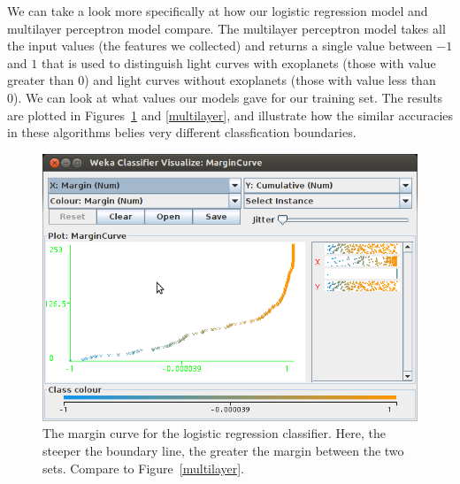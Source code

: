 \documentclass{amsart}
\begin{document}
We can take a look more specifically at how our logistic regression model and multilayer perceptron model compare. The multilayer perceptron model takes all the input values (the features we collected) and returns a single value between $-1$ and $1$ that is used to distinguish light curves with exoplanets (those with value greater than 0) and light curves without exoplanets (those with value less than 0). We can look at what values our models gave for our training set. The results are plotted in Figures~\ref{logistic} and \ref{multilayer}, and illustrate how the similar accuracies in these algorithms belies very different classfication boundaries.
	\begin{figure}
	\centering
	\label{logistic}
	\includegraphics[width=6in]{logistic_regression}
	\caption{The margin curve for the logistic regression classifier. Here, the steeper the boundary line, the greater the margin between the two sets. Compare to Figure~\ref{multilayer}.}
	\end{figure}
\end{document}
